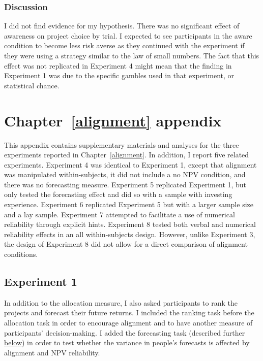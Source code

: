 \documentclass[a4paper, nobind, dvipsnames]{templates/ociamthesis}
\theoremstyle{definition}
\theoremstyle{definition}
\theoremstyle{definition}
\theoremstyle{definition}
\theoremstyle{remark}
\begin{document}
\subsection{Discussion}

I did not find evidence for my hypothesis. There was no significant effect of
awareness on project choice by trial. I expected to see participants in the
aware condition to become less risk averse as they continued with the experiment
if they were using a strategy similar to the law of small numbers. The fact that
this effect was not replicated in Experiment 4 might mean that the finding in
Experiment 1 was due to the specific gambles used in that experiment, or
statistical chance.

\hypertarget{alignment-appendix}{%
\chapter{Chapter~\ref{alignment} appendix}\label{alignment-appendix}}

\minitoc

This appendix contains supplementary materials and analyses for the three
experiments reported in Chapter~\ref{alignment}. In addition, I report five
related experiments. Experiment 4 was identical to Experiment 1, except that
alignment was manipulated within-subjects, it did not include a no NPV
condition, and there was no forecasting measure. Experiment 5 replicated
Experiment 1, but only tested the forecasting effect and did so with a sample
with investing experience. Experiment 6 replicated Experiment 5 but with a
larger sample size and a lay sample. Experiment 7 attempted to facilitate a use
of numerical reliability through explicit hints. Experiment 8 tested both verbal
and numerical reliability effects in an all within-subjects design. However,
unlike Experiment 3, the design of Experiment 8 did not allow for a direct
comparison of alignment conditions.

\hypertarget{alignment-2-appendix}{%
\section{Experiment 1}\label{alignment-2-appendix}}

In addition to the allocation measure, I also asked participants to rank the
projects and forecast their future returns. I included the ranking task before
the allocation task in order to encourage alignment and to have another measure
of participants' decision-making. I added the forecasting task (described
further \protect\hyperlink{forecasting-materials-alignment-2}{below}) in order to test whether
the variance in people's forecasts is affected by alignment and NPV reliability.
\end{document}
